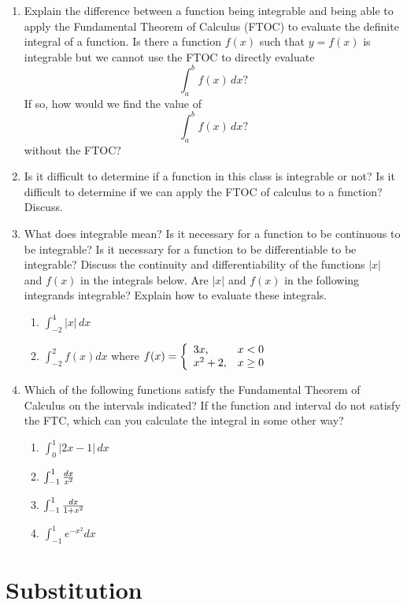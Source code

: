\begin{enumerate}
\item   Explain the difference between a function being integrable and being able to apply the Fundamental Theorem of Calculus (FTOC) to evaluate the definite integral of a function.  Is there a function $f(x)$ such that $y = f(x)$ is integrable but we cannot use the FTOC to directly evaluate $$\int_a^b {f(x)\,dx} ?$$  If so, how would we find the value of $$\int_a^b {f(x)\,dx} ?$$ without the FTOC?  

\item Is it difficult to determine if a function in this class is integrable or not?  Is it difficult to determine if we can apply the FTOC of calculus to a function?  Discuss.

\item   What does integrable mean?  Is it necessary for a function to be continuous to be integrable?  Is it necessary for a function to be differentiable to be integrable?  Discuss the continuity and differentiability of the functions ${\left| x \right|}$ and $f(x)$ in the integrals below.  Are ${\left| x \right|}$ and $f(x)$ in the following integrands integrable?  Explain how to evaluate these integrals.
\begin{enumerate}
\item $\int_{ - 2}^4 {\left| x \right|\,dx} $ 
\item $\int_{ - 2}^2 {f(x)dx} $ 
	where 
		$f(x) = \left\{ \begin{array}{ll}  3x, & x < 0 \cr   x^2  + 2, & x \ge 0 \cr \end{array} \right.$
\end{enumerate}

\item   Which of the following functions satisfy the Fundamental Theorem of Calculus on the intervals indicated?  If the function and interval do not satisfy the FTC, which can you calculate the integral in some other way?  
\begin{enumerate}\item $\int_0^1 {\left| {2x - 1} \right|\,dx} $ \item $\int_{ - 1}^1 {{{dx} \over {x^2 }}} $ \item $\int_{ - 1}^1 {{{dx} \over {1 + x^2 }}} $ \item $\int_{ - 1}^1 {e^{ - x^2 } dx} $ \end{enumerate}

\end{enumerate}\section{Substitution}\begin{enumerate}


\end{enumerate}
